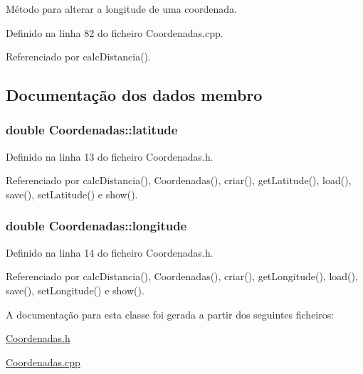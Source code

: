 Método para alterar a longitude de uma coordenada. 



Definido na linha 82 do ficheiro Coordenadas.\+cpp.



Referenciado por calc\+Distancia().



\subsection{Documentação dos dados membro}
\hypertarget{class_coordenadas_ad7aa0271fc0ca8c8da179f9cfe859bf0}{
\subsubsection[{latitude}]{\setlength{\rightskip}{0pt plus 5cm}double Coordenadas\+::latitude\hspace{0.3cm}{\ttfamily [private]}}}\label{class_coordenadas_ad7aa0271fc0ca8c8da179f9cfe859bf0}


Definido na linha 13 do ficheiro Coordenadas.\+h.



Referenciado por calc\+Distancia(), Coordenadas(), criar(), get\+Latitude(), load(), save(), set\+Latitude() e show().

\hypertarget{class_coordenadas_a328c0d572b3a7d47bfbd866f5d6d6489}{
\subsubsection[{longitude}]{\setlength{\rightskip}{0pt plus 5cm}double Coordenadas\+::longitude\hspace{0.3cm}{\ttfamily [private]}}}\label{class_coordenadas_a328c0d572b3a7d47bfbd866f5d6d6489}


Definido na linha 14 do ficheiro Coordenadas.\+h.



Referenciado por calc\+Distancia(), Coordenadas(), criar(), get\+Longitude(), load(), save(), set\+Longitude() e show().



A documentação para esta classe foi gerada a partir dos seguintes ficheiros\+:\begin{DoxyCompactItemize}
\item 
\hyperlink{_coordenadas_8h}{Coordenadas.\+h}\item 
\hyperlink{_coordenadas_8cpp}{Coordenadas.\+cpp}\end{DoxyCompactItemize}
